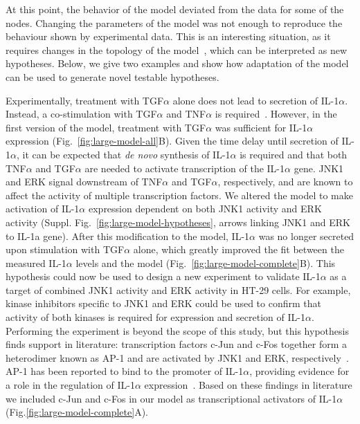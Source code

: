 \documentclass{bmcart}
\begin{document}
At this point, the behavior of the model deviated from the data for some of the nodes.
Changing the parameters of the model was not enough to reproduce the behaviour shown by experimental
data. This is an interesting situation, as it requires changes in the topology of
the model~\cite{animo-syncop}, which can be interpreted as new hypotheses. Below, we give two examples and show how
adaptation of the model can be used to generate novel testable hypotheses.





Experimentally,
treatment with TGF$\alpha$ alone does not lead to secretion of IL-1$\alpha$. Instead, a co-stimulation with
TGF$\alpha$ and TNF$\alpha$ is required~\cite{pathway-autocrine}.
However, in the first version of the model, treatment with TGF$\alpha$ was sufficient for
IL-1$\alpha$ expression (Fig.~\ref{fig:large-model-all}B). Given the time delay until secretion of IL-1$\alpha$, it can be
expected that \emph{de novo} synthesis of IL-1$\alpha$ is required and that both
TNF$\alpha$ and TGF$\alpha$ are needed to activate transcription of the IL-1$\alpha$ gene.
JNK1 and ERK signal downstream of TNF$\alpha$ and TGF$\alpha$, respectively, and are known
to affect the activity of multiple transcription factors. We altered the model to make
activation of IL-1$\alpha$ expression dependent on both JNK1 activity and ERK activity
(Suppl. Fig.~\ref{fig:large-model-hypotheses}, arrows linking {\sf JNK1} and {\sf ERK} to {\sf IL-1a gene}).
After this modification to the model, IL-1$\alpha$ was no longer secreted
upon stimulation with TGF$\alpha$ alone, which greatly improved the fit between the measured IL-1$\alpha$
levels and the model (Fig.~\ref{fig:large-model-complete}B). This hypothesis could now be used to
design a new experiment to validate IL-1$\alpha$ as a target of combined JNK1 activity and ERK activity in
HT-29 cells. For example, kinase inhibitors specific to JNK1 and ERK could be used to confirm that activity of
both kinases is required for expression and secretion of IL-1$\alpha$. Performing the experiment is beyond
the scope of this study, but this hypothesis finds support in literature:
transcription factors c-Jun and c-Fos together
form a heterodimer known as AP-1 and are activated by JNK1 and ERK,
respectively~\cite{jnk-signaling,cfos-cjun}. AP-1 has been reported to bind to the
promoter of IL-1$\alpha$, providing evidence for a role in the regulation of IL-1$\alpha$
expression~\cite{ap1-il1a}. Based on these findings in literature we included c-Jun and
c-Fos in our model as transcriptional activators of IL-1$\alpha$ (Fig.\ref{fig:large-model-complete}A).
\end{document}

